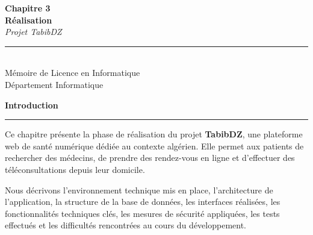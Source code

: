 \documentclass[12pt,a4paper]{report}
\begin{document}

\newpage
\thispagestyle{empty}
\vspace*{\fill}

\begin{center}
  {\Huge\bfseries Chapitre 3}\\[0.8cm]
  {\huge\bfseries R\'ealisation}\\[1.2cm]
  {\large\itshape Projet TabibDZ}\\[2cm]
  \rule{0.5\textwidth}{0.4pt}\\[1.2cm]
  {\normalsize M\'emoire de Licence en Informatique}\\[0.3cm]
  {\small D\'epartement Informatique}
\end{center}

\vspace*{\fill}
\newpage

\thispagestyle{fancy}
\vspace*{\fill}

\begin{center}
{\Huge\bfseries Introduction}

\vspace{0.3cm}

\rule{0.5\textwidth}{1.2pt}
\end{center}

\vspace{0.8cm}


Ce chapitre pr\'esente la phase de r\'ealisation du projet \textbf{TabibDZ}, une plateforme web de sant\'e num\'erique d\'edi\'ee au contexte alg\'erien. Elle permet aux patients de rechercher des m\'edecins, de prendre des rendez-vous en ligne et d'effectuer des t\'el\'econsultations depuis leur domicile.

Nous d\'ecrivons l'environnement technique mis en place, l'architecture de l'application, la structure de la base de donn\'ees, les interfaces r\'ealis\'ees, les fonctionnalit\'es techniques cl\'es, les mesures de s\'ecurit\'e appliqu\'ees, les tests effectu\'es et les difficult\'es rencontr\'ees au cours du d\'eveloppement.

\vspace*{\fill}
\newpage
\end{document}
